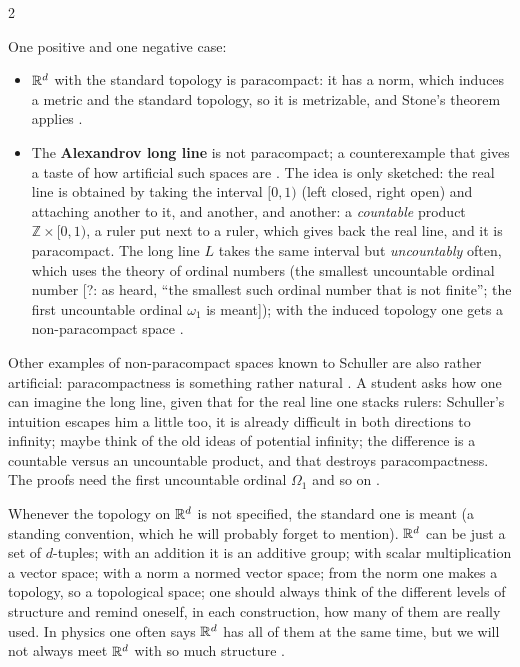 \begin{paracol}{2}
\begin{example}\label{ex:iv-para}
One positive and one negative case:
\begin{itemize}
  \item $\mathbb{R}^d$ with the standard topology is paracompact: it has a norm, which induces a metric and the standard topology, so it is metrizable, and Stone's theorem
        applies .
  \item The \textbf{Alexandrov long line} is not paracompact; a counterexample that gives a taste of how artificial such spaces are . The idea
        is only sketched: the real line is obtained by taking the interval $[0,1)$ (left closed, right open) and attaching another to it, and another, and another: a
        \emph{countable} product $\mathbb Z\times[0,1)$, a ruler put next to a ruler, which gives back the real line, and it is paracompact. The long line $L$ takes the same
        interval but \emph{uncountably} often, which uses the theory of ordinal numbers (the smallest uncountable ordinal number [?: as heard, ``the smallest such ordinal number that
        is not finite''; the first uncountable ordinal $\omega_1$ is meant]); with the induced topology one gets a non-paracompact space
        .
\end{itemize}
\end{example}
Other examples of non-paracompact spaces known to Schuller are also rather artificial: paracompactness is something rather natural . A student asks
how one can imagine the long line, given that for the real line one stacks rulers: Schuller's intuition escapes him a little too, it is already difficult in both directions to infinity;
maybe think of the old ideas of potential infinity; the difference is a countable versus an uncountable product, and that destroys paracompactness. The proofs need the first uncountable
ordinal $\Omega_1$ and so on .

\begin{remark}\label{rem:iv-levels}
Whenever the topology on $\mathbb{R}^d$ is not specified, the standard one is meant (a standing convention, which he will probably forget to mention). $\mathbb{R}^d$ can be just a set of $d$-tuples; with
an addition it is an additive group; with scalar multiplication a vector space; with a norm a normed vector space; from the norm one makes a topology, so a topological space; one should always
think of the different levels of structure and remind oneself, in each construction, how many of them are really used. In physics one often says $\mathbb{R}^d$ has all of them at the same time, but we will not
always meet $\mathbb{R}^d$ with so much structure .
\end{remark}


\end{paracol}

